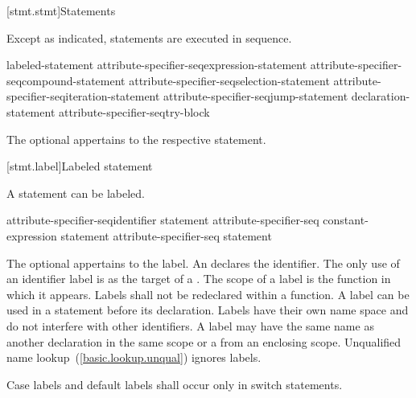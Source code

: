 [stmt.stmt]{Statements}%



\pnum
Except as indicated, statements are executed in sequence.

\begin{bnf}
\br
    labeled-statement\br
    attribute-specifier-seq\opt expression-statement\br
    attribute-specifier-seq\opt compound-statement\br
    attribute-specifier-seq\opt selection-statement\br
    attribute-specifier-seq\opt iteration-statement\br
    attribute-specifier-seq\opt jump-statement\br
    declaration-statement\br
    attribute-specifier-seq\opt try-block
\end{bnf}

The optional  appertains to the respective statement.

[stmt.label]{Labeled statement}%

\pnum
{}%
%
A statement can be labeled.

\begin{bnf}
\br
    attribute-specifier-seq\opt identifier \terminal{:} statement\br
    attribute-specifier-seq\opt{}  constant-expression \terminal{:} statement\br
    attribute-specifier-seq\opt{}  statement
\end{bnf}

The optional  appertains to the label. An
 declares the identifier. The only use of an
identifier label is as the target of a
%
.
%
The scope of a label is the function in which it appears. Labels shall
not be redeclared within a function. A label can be used in a
 statement before its declaration.
%
Labels have their own name space and do not interfere with other
identifiers.
\enternote
A label may have the same name as another declaration in the same scope or a
 from an enclosing scope. Unqualified name
lookup~(\ref{basic.lookup.unqual}) ignores labels.
\exitnote

\pnum
{}%
%
Case labels and default labels shall occur only in switch statements.



